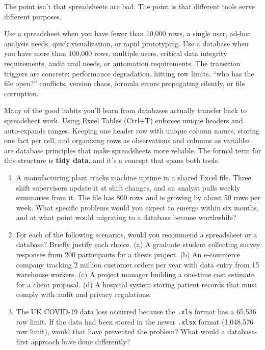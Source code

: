 \documentclass[
  letterpaper,
  DIV=11,
  numbers=noendperiod]{scrreprt}
\begin{document}
The point isn't that spreadsheets are bad. The point is that different
tools serve different purposes.

Use a spreadsheet when you have fewer than 10,000 rows, a single user,
ad-hoc analysis needs, quick visualization, or rapid prototyping. Use a
database when you have more than 100,000 rows, multiple users, critical
data integrity requirements, audit trail needs, or automation
requirements. The transition triggers are concrete: performance
degradation, hitting row limits, ``who has the file open?'' conflicts,
version chaos, formula errors propagating silently, or file corruption.

Many of the good habits you'll learn from databases actually transfer
back to spreadsheet work. Using Excel Tables (Ctrl+T) enforces unique
headers and auto-expands ranges. Keeping one header row with unique
column names, storing one fact per cell, and organizing rows as
observations and columns as variables are database principles that make
spreadsheets more reliable. The formal term for this structure is
\textbf{tidy data}, and it's a concept that spans both tools.

\begin{tcolorbox}[enhanced jigsaw, opacitybacktitle=0.6, arc=.35mm, colback=white, bottomtitle=1mm, opacityback=0, toprule=.15mm, left=2mm, colbacktitle=quarto-callout-note-color!10!white, breakable, coltitle=black, toptitle=1mm, colframe=quarto-callout-note-color-frame, bottomrule=.15mm, titlerule=0mm, title=\textcolor{quarto-callout-note-color}{\faInfo}\hspace{0.5em}{Exercises}, rightrule=.15mm, leftrule=.75mm]

\begin{enumerate}
\def\labelenumi{\arabic{enumi}.}
\item
  A manufacturing plant tracks machine uptime in a shared Excel file.
  Three shift supervisors update it at shift changes, and an analyst
  pulls weekly summaries from it. The file has 800 rows and is growing
  by about 50 rows per week. What specific problems would you expect to
  emerge within six months, and at what point would migrating to a
  database become worthwhile?
\item
  For each of the following scenarios, would you recommend a spreadsheet
  or a database? Briefly justify each choice. (a) A graduate student
  collecting survey responses from 200 participants for a thesis
  project. (b) An e-commerce company tracking 2 million customer orders
  per year with data entry from 15 warehouse workers. (c) A project
  manager building a one-time cost estimate for a client proposal. (d) A
  hospital system storing patient records that must comply with audit
  and privacy regulations.
\item
  The UK COVID-19 data loss occurred because the \texttt{.xls} format
  has a 65,536 row limit. If the data had been stored in the newer
  \texttt{.xlsx} format (1,048,576 row limit), would that have prevented
  the problem? What would a database-first approach have done
  differently?
\end{enumerate}

\end{tcolorbox}
\end{document}
